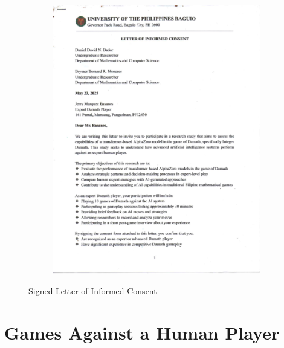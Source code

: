 \begin{appendices}
\begin{figure}[H]
\begin{subfigure}{0.3\textwidth}
        \includegraphics[page=3,width=\linewidth]{images/Letter of Informed Consent.pdf}
    \end{subfigure}
    \caption{Signed Letter of Informed Consent}
    \label{fig:signed-letter-of-informed-consent}
\end{figure}

\chapter{Games Against a Human Player}


\end{appendices}
